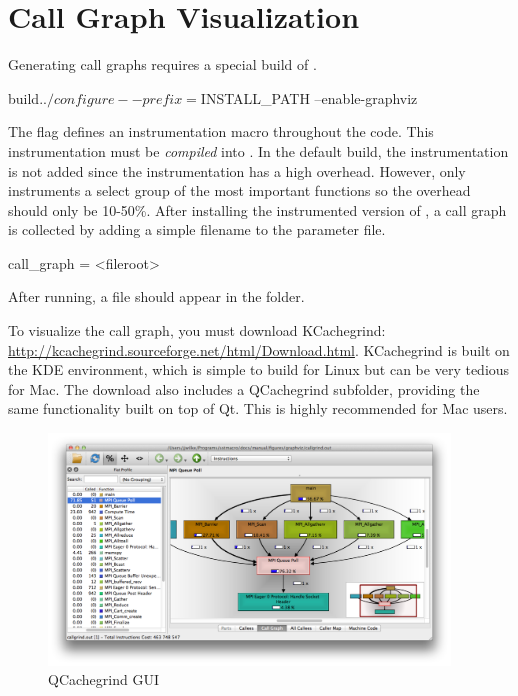 

\section{Call Graph Visualization}
\label{sec:tutorials:callgraph}
Generating call graphs requires a special build of \sstmacro.

\begin{ShellCmd}
build$ ../configure --prefix=$INSTALL_PATH --enable-graphviz
\end{ShellCmd}
The  flag defines an instrumentation macro throughout the \sstmacro code.
This instrumentation must be \emph{compiled} into \sstmacro.
In the default build, the instrumentation is not added since the instrumentation has a high overhead.
However, \sstmacro only instruments a select group of the most important functions so the overhead should only be 10-50\%.
After installing the instrumented version of \sstmacro, a call graph is collected by adding a simple filename to the parameter file.

\begin{ViFile}
call_graph = <fileroot>
\end{ViFile}
After running, a  file should appear in the folder.

To visualize the call graph, you must download KCachegrind: \url{http://kcachegrind.sourceforge.net/html/Download.html}.
KCachegrind is built on the KDE environment, which is simple to build for Linux but can be very tedious for Mac.
The download also includes a QCachegrind subfolder, providing the same functionality built on top of Qt.  
This is highly recommended for Mac users.

\begin{figure}[h]
\centering
\includegraphics[width=0.95\textwidth]{figures/graphviz/gui.pdf}
\caption{QCachegrind GUI}
\label{fig:qcgui}
\end{figure}

